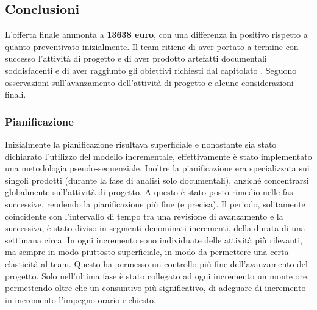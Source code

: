 \subsection{Conclusioni}
    L'offerta finale ammonta a \textbf{13638 euro}, con una differenza in positivo rispetto a quanto preventivato inizialmente. Il team ritiene di aver portato a termine con successo l'attività di progetto e di aver prodotto artefatti documentali soddisfacenti e di aver raggiunto gli obiettivi richiesti dal capitolato \hd .
    Seguono osservazioni sull'avanzamento dell'attività di progetto e alcune considerazioni finali.
        \subsubsection{Pianificazione}
          Inizialmente la pianificazione risultava superficiale e nonostante sia stato dichiarato l'utilizzo del modello incrementale, effettivamente è stato implementato una metodologia pseudo-sequenziale. Inoltre la pianificazione era specializzata sui singoli prodotti (durante la fase di analisi solo documentali), anziché concentrarsi globalmente sull'attività di progetto. A questo è stato posto rimedio nelle fasi successive, rendendo la pianificazione più fine (e precisa). Il periodo, solitamente coincidente con l'intervallo di tempo tra una revisione di avanzamento e la successiva, è stato diviso in segmenti denominati incrementi, della durata di una settimana circa. In ogni incremento sono individuate delle attività più rilevanti, ma sempre in modo piuttosto superficiale, in modo da permettere una certa elasticità al team. Questo ha permesso un controllo più fine dell'avanzamento del progetto. Solo nell'ultima fase è stato collegato ad ogni incremento un monte ore, permettendo oltre che un consuntivo più significativo, di adeguare di incremento in incremento l'impegno orario richiesto.
